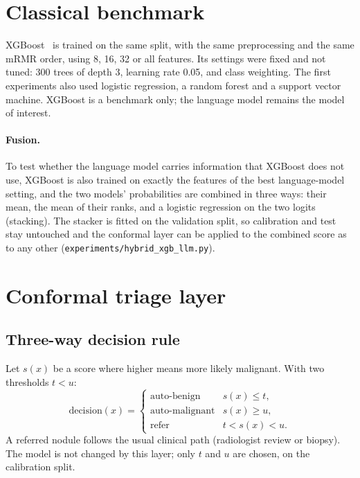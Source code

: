\section{Classical benchmark}
\label{sec:methods-xgb}

XGBoost~\citep{chen2016xgboost} is trained on the same split, with the same preprocessing and the
same mRMR order, using 8, 16, 32 or all features. Its settings were fixed and not tuned: 300 trees
of depth 3, learning rate 0.05, and class weighting. The first experiments also used logistic
regression, a random forest and a support vector machine. XGBoost is a benchmark only; the
language model remains the model of interest.

\paragraph{Fusion.} To test whether the language model carries information that XGBoost does not
use, XGBoost is also trained on exactly the features of the best language-model setting, and the
two models' probabilities are combined in three ways: their mean, the mean of their ranks, and a
logistic regression on the two logits (stacking). The stacker is fitted on the validation split,
so calibration and test stay untouched and the conformal layer can be applied to the combined
score as to any other (\texttt{experiments/hybrid\_xgb\_llm.py}).

\section{Conformal triage layer}
\label{sec:methods-triage}

\subsection{Three-way decision rule}

Let $s(x)$ be a score where higher means more likely malignant. With two thresholds $t < u$:
\[
  \text{decision}(x) =
  \begin{cases}
    \text{auto-benign}    & s(x) \le t, \\
    \text{auto-malignant} & s(x) \ge u, \\
    \text{refer}          & t < s(x) < u.
  \end{cases}
\]
A referred nodule follows the usual clinical path (radiologist review or biopsy). The model is not
changed by this layer; only $t$ and $u$ are chosen, on the calibration split.

